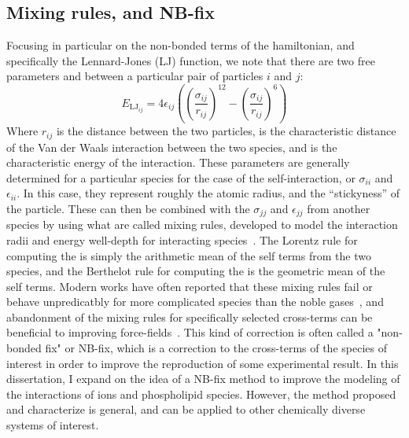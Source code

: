 \subsection{Mixing rules, and NB-fix}
Focusing in particular on the non-bonded terms of the hamiltonian, and specifically the Lennard-Jones (LJ) function, we note that there are two
free parameters \sigmaij{} and \epsilonij{} between a particular pair of particles $i$ and $j$:
\begin{equation}
E_{\mathrm{LJ}_{ij}} = 4\epsilon_{ij} \left( \left( \frac{\sigma_{ij}}{r_{ij}} \right)^{12}
- \left( \frac{\sigma_{ij}}{r_{ij}} \right)^{6} \right)
\end{equation}
Where $r_{ij}$ is the distance between the two particles, \sigmaij{} is the characteristic distance of the Van der Waals interaction between the two species,
and \epsilonij{} is the characteristic energy of the interaction.
These parameters are generally determined for a particular species for the case of the self-interaction, or $\sigma_{ii}$ and $\epsilon_{ii}$.
In this case, they represent roughly the atomic radius, and the ``stickyness'' of the particle. These can then be combined with the 
$\sigma_{jj}$ and $\epsilon_{jj}$ from another species by using what are called mixing rules, developed to 
model the interaction radii and energy well-depth for interacting species~\cite{lorentz:1881,berthelot:1898}.
The Lorentz rule for computing the \sigmaij{} is simply the arithmetic mean of the self terms from the two species, and 
the Berthelot rule for computing the \epsilonij{} is the geometric mean of the self terms.
Modern works have often reported that these mixing rules fail
or behave unpredicatbly for more complicated species than the noble gases~\cite{fyta:2012,boda:2008:effects},
and abandonment of the mixing rules for specifically selected cross-terms can be beneficial to improving
force-fields~\cite{baker:2010:accurate,yoo:2012:improved,fyta:2012:ionic,mamatkulov:2013:force,venable:2013,
savelyev:2014:balancing,li:2015:representation,savelyev:2015:competition,jing:2017:study,reif:2017,wineman:2019}. This 
kind of correction is often called a "non-bonded fix" or NB-fix, which is a correction to the cross-terms of the species of interest 
in order to improve the reproduction of some experimental result.
In this dissertation, I expand on the idea of a NB-fix method to improve the modeling of the interactions of ions and phospholipid species.
However, the method proposed and characterize is general, and can be applied to other chemically diverse systems of interest.

